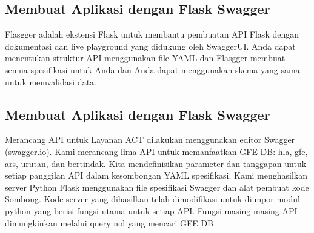 \documentclass[12pt]{article}
\begin{document}
\subsection{Membuat Aplikasi dengan Flask Swagger}
Flasgger adalah ekstensi Flask untuk membantu pembuatan API Flask dengan dokumentasi dan live playground yang didukung oleh SwaggerUI. Anda dapat menentukan struktur API menggunakan file YAML dan Flasgger membuat semua spesifikasi untuk Anda dan Anda dapat menggunakan skema yang sama untuk memvalidasi data.


\subsection{Membuat Aplikasi dengan Flask Swagger}
Merancang API untuk Layanan ACT dilakukan menggunakan editor Swagger (swagger.io).
Kami merancang lima API untuk memanfaatkan GFE DB: hla, gfe, ars, urutan, dan bertindak. Kita
mendefinisikan parameter dan tanggapan untuk setiap panggilan API dalam kesombongan YAML
spesifikasi. Kami menghasilkan server Python Flask menggunakan file spesifikasi Swagger
dan alat pembuat kode Sombong. Kode server yang dihasilkan telah dimodifikasi untuk diimpor
modul python yang berisi fungsi utama untuk setiap API. Fungsi masing-masing
API dimungkinkan melalui query nol yang mencari GFE DB \cite{halagan2017bioinformatics}
\end{document}
